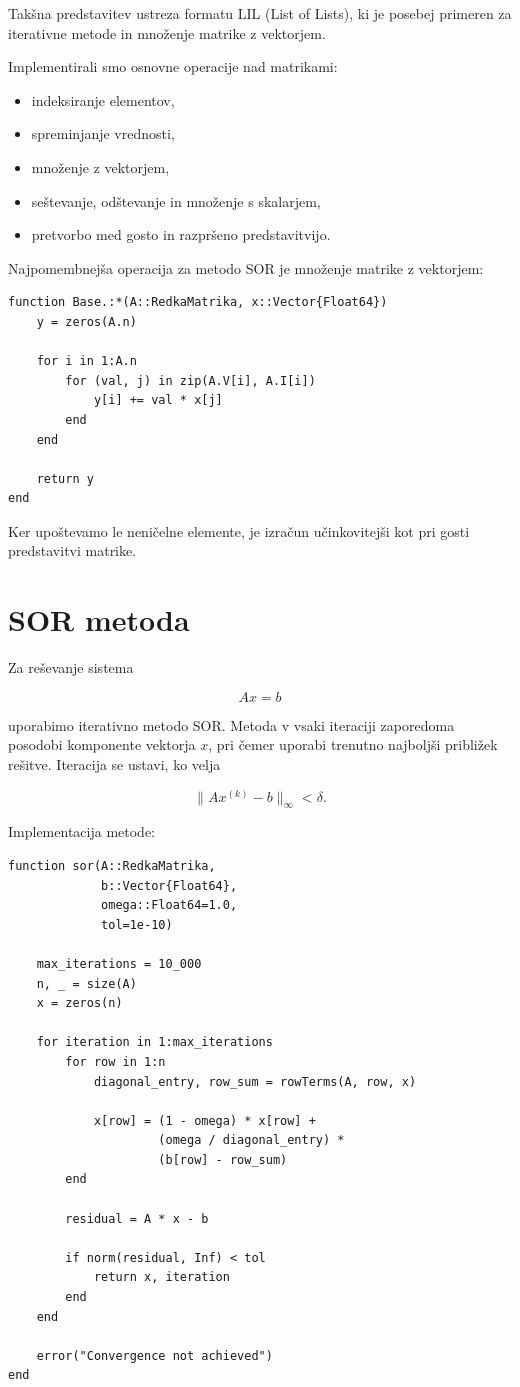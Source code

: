 \documentclass[a4paper,12pt]{article}
\begin{document}
\noindent Takšna predstavitev ustreza formatu LIL (List of Lists), ki je posebej primeren za iterativne metode in množenje matrike z vektorjem.

\noindent Implementirali smo osnovne operacije nad matrikami:
\begin{itemize}
    \item indeksiranje elementov,
    \item spreminjanje vrednosti,
    \item množenje z vektorjem,
    \item seštevanje, odštevanje in množenje s skalarjem,
    \item pretvorbo med gosto in razpršeno predstavitvijo.
\end{itemize}

\noindent Najpomembnejša operacija za metodo SOR je množenje matrike z vektorjem:

\begin{verbatim}
function Base.:*(A::RedkaMatrika, x::Vector{Float64})
    y = zeros(A.n)

    for i in 1:A.n
        for (val, j) in zip(A.V[i], A.I[i])
            y[i] += val * x[j]
        end
    end

    return y
end
\end{verbatim}

\noindent Ker upoštevamo le neničelne elemente, je izračun učinkovitejši kot pri gosti predstavitvi matrike.

\section{SOR metoda}

Za reševanje sistema

\[
A x = b
\]

\noindent uporabimo iterativno metodo SOR. Metoda v vsaki iteraciji zaporedoma posodobi komponente vektorja \(x\), pri čemer uporabi trenutno najboljši približek rešitve. Iteracija se ustavi, ko velja

\[
\|Ax^{(k)} - b\|_\infty < \delta.
\]

\noindent Implementacija metode:

\begin{verbatim}
function sor(A::RedkaMatrika,
             b::Vector{Float64},
             omega::Float64=1.0,
             tol=1e-10)

    max_iterations = 10_000
    n, _ = size(A)
    x = zeros(n)

    for iteration in 1:max_iterations
        for row in 1:n
            diagonal_entry, row_sum = rowTerms(A, row, x)

            x[row] = (1 - omega) * x[row] +
                     (omega / diagonal_entry) *
                     (b[row] - row_sum)
        end

        residual = A * x - b

        if norm(residual, Inf) < tol
            return x, iteration
        end
    end

    error("Convergence not achieved")
end
\end{verbatim}
\end{document}
